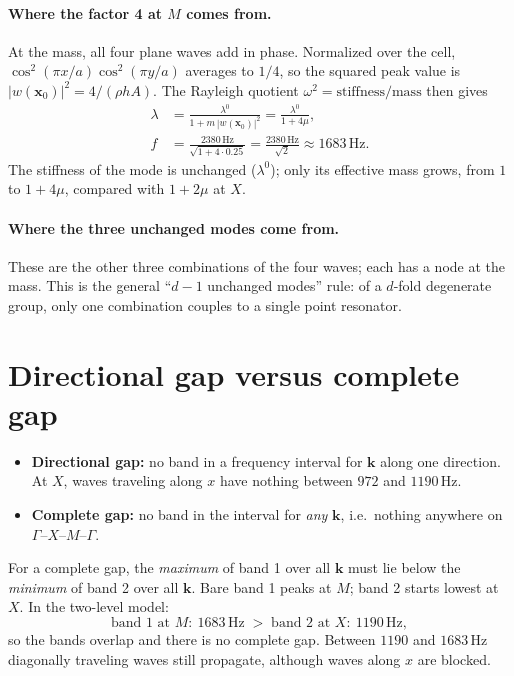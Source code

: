 \paragraph{Where the factor 4 at $M$ comes from.}
At the mass, all four plane waves add in phase. Normalized over the cell,
$\cos^2(\pi x/a)\cos^2(\pi y/a)$ averages to $1/4$, so the squared peak value
is $|w(\mathbf{x}_0)|^2 = 4/(\rho h A)$. The Rayleigh quotient
$\omega^2 = \text{stiffness}/\text{mass}$ then gives
\begin{align}
  \lambda &= \frac{\lambda^0}{1 + m\,|w(\mathbf{x}_0)|^2} = \frac{\lambda^0}{1 + 4\mu}, \\
  f &= \frac{2380\,\mathrm{Hz}}{\sqrt{1 + 4\cdot 0.25}} = \frac{2380\,\mathrm{Hz}}{\sqrt{2}} \approx 1683\,\mathrm{Hz}.
\end{align}
The stiffness of the mode is unchanged ($\lambda^0$); only its effective mass
grows, from $1$ to $1 + 4\mu$, compared with $1 + 2\mu$ at $X$.

\paragraph{Where the three unchanged modes come from.}
These are the other three combinations of the four waves; each has a node at
the mass. This is the general ``$d - 1$ unchanged modes'' rule: of a
$d$-fold degenerate group, only one combination couples to a single point
resonator.

\section{Directional gap versus complete gap}

\begin{itemize}
  \item \textbf{Directional gap:} no band in a frequency interval for
        $\mathbf{k}$ along one direction. At $X$, waves traveling along $x$
        have nothing between $972$ and $1190\,\mathrm{Hz}$.
  \item \textbf{Complete gap:} no band in the interval for \emph{any}
        $\mathbf{k}$, i.e.\ nothing anywhere on $\Gamma$--$X$--$M$--$\Gamma$.
\end{itemize}
For a complete gap, the \emph{maximum} of band 1 over all $\mathbf{k}$ must
lie below the \emph{minimum} of band 2 over all $\mathbf{k}$. Bare band 1
peaks at $M$; band 2 starts lowest at $X$. In the two-level model:
\begin{equation}
  \text{band 1 at } M:\ 1683\,\mathrm{Hz} \;>\; \text{band 2 at } X:\ 1190\,\mathrm{Hz},
\end{equation}
so the bands overlap and there is no complete gap.
Between $1190$ and $1683\,\mathrm{Hz}$ diagonally traveling waves still
propagate, although waves along $x$ are blocked.

